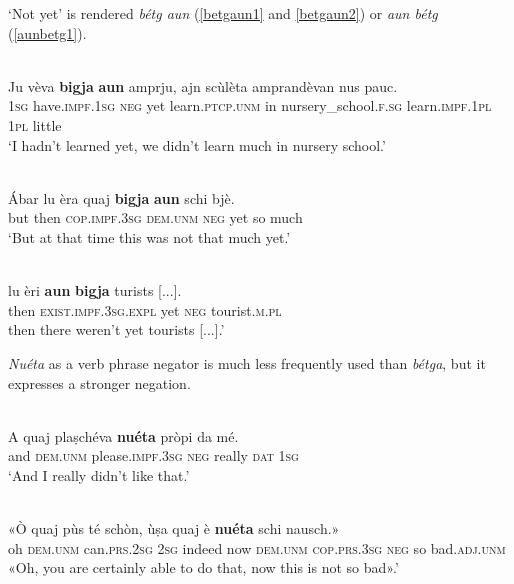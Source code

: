 `Not yet' is rendered \textit{bétg aun} (\ref{betgaun1} and \ref{betgaun2}) or \textit{aun bétg} (\ref{aunbetg1}).

\ea
\label{betgaun1}
\\
\gll  Ju vèva \textbf{bigja} \textbf{aun} amprju, ajn scùlèta amprandèvan nus pauc.\\
\textsc{1sg} have.\textsc{impf.1sg} \textsc{neg} yet  learn.\textsc{ptcp.unm} in  nursery\_school.\textsc{f.sg} learn.\textsc{impf.1pl}  \textsc{1pl} little \\
\glt `I hadn’t learned yet, we didn’t learn much in nursery school.'
\z

\ea
\label{betgaun2}
\\
\gll  Ábar lu èra quaj \textbf{bigja} \textbf{aun} schi bjè.  \\
but then \textsc{cop.impf.3sg} \textsc{dem.unm} \textsc{neg} yet so much  \\
\glt `But at that time this was not that much yet.'
\z

\ea
\label{aunbetg1}
\\
\gll    [...] lu èri \textbf{aun} \textbf{bigja} turists [...]. \\
{} then \textsc{exist.impf.3sg.expl} yet \textsc{neg} tourist.\textsc{m.pl}\\
\glt [...]  then there weren’t yet tourists [...].'
\z


\textit{Nuéta} as a verb phrase negator is much less frequently used than \textit{bétga}, but it expresses a stronger negation.

\ea
\label{}
\\
\gll A quaj plaṣchéva \textbf{nuéta} pròpi da mé. \\
and \textsc{dem.unm} please.\textsc{impf.3sg} \textsc{neg} really \textsc{dat} \textsc{1sg}\\
\glt `And I really didn’t  like that.'
\z

\ea
\label{}
\\
	\gll «Ò quaj pùs té schòn, ùṣa quaj è \textbf{nuéta} schi nausch.»\\
oh \textsc{dem.unm} can.\textsc{prs.2sg} \textsc{2sg} indeed now \textsc{dem.unm} \textsc{cop.prs.3sg} \textsc{neg} so bad.\textsc{adj.unm}\\
\glt «Oh, you are certainly able to do that, now this is not so bad».'
\z

